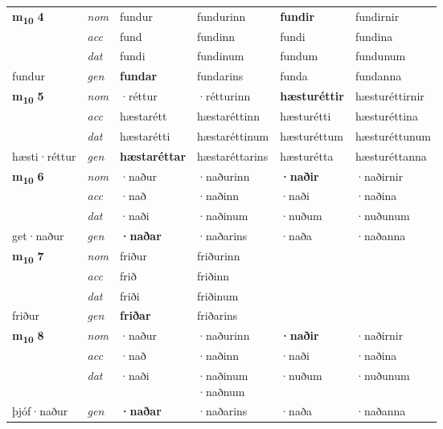 \begin{longtable}[l]{X>{\footnotesize\itshape}XXXXX}
\multirow{3}{*}{{{\textbf{m{\textsubscript{10}}} \Large{\textbf{4}}}}} & nom & fundur & fundurinn & \textbf{fundir} & fundirnir \\*
 & acc & fund & fundinn & fundi & fundina \\*
 & dat & fundi & fundinum & fundum & fundunum \\*
 {\footnotesize{fundur}} & gen & \textbf{fundar} & fundarins & funda & fundanna \\
\cmidrule{1-6}

\multirow{3}{*}{{{\textbf{m{\textsubscript{10}}} \Large{\textbf{5}}}}} & nom & ·réttur & ·rétturinn & \textbf{hæsturéttir} & hæsturéttirnir \\*
 & acc & hæstarétt & hæstaréttinn & hæsturétti & hæsturéttina \\*
 & dat & hæstarétti & hæstaréttinum & hæsturéttum & hæsturéttunum \\*
 {\footnotesize{hæsti\allowbreak ·réttur}} & gen & \textbf{hæstaréttar} & hæstaréttarins & hæsturétta & hæsturéttanna \\
\cmidrule{1-6}

\multirow{3}{*}{{{\textbf{m{\textsubscript{10}}} \Large{\textbf{6}}}}} & nom & ·naður & ·naðurinn & \textbf{·naðir} & ·naðirnir \\*
 & acc & ·nað & ·naðinn & ·naði & ·naðina \\*
 & dat & ·naði & ·naðinum & ·nuðum & ·nuðunum \\*
 {\footnotesize{get\allowbreak ·naður}} & gen & \textbf{·naðar} & ·naðarins & ·naða & ·naðanna \\
\cmidrule{1-6}

\multirow{3}{*}{{{\textbf{m{\textsubscript{10}}} \Large{\textbf{7}}}}} & nom & friður & friðurinn & \textbf{} &  \\*
 & acc & frið & friðinn &  &  \\*
 & dat & friði & friðinum &  &  \\*
 {\footnotesize{friður}} & gen & \textbf{friðar} & friðarins &  &  \\
\cmidrule{1-6}

\multirow{3}{*}{{{\textbf{m{\textsubscript{10}}} \Large{\textbf{8}}}}} & nom & ·naður & ·naðurinn & \textbf{·naðir} & ·naðirnir \\*
 & acc & ·nað & ·naðinn & ·naði & ·naðina \\*
 & dat & ·naði & \specialcell{·naðinum\\  ·naðnum} & ·nuðum & ·nuðunum \\*
 {\footnotesize{þjóf\allowbreak ·naður}} & gen & \textbf{·naðar} & ·naðarins & ·naða & ·naðanna \\
\cmidrule{1-6}


\end{longtable}
